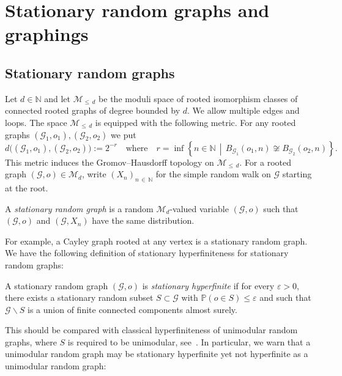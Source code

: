 \documentclass[AHL,Unicode,longabstracts,published]{cedram}
\newcommand{\bbN}{\mathbb{N}}
\newcommand{\bbP}{\mathbb{P}}
\newcommand{\calM}{\mathcal{M}}
\newcommand{\calG}{\mathcal{G}}
\begin{document}
\section{Stationary random graphs and graphings}\label{sec:stationary}

\subsection{Stationary random graphs}\label{sec:SRG}

Let $d\in\bbN$ and let $\calM_{\leq\,d}$ be the moduli space of rooted isomorphism classes of connected rooted graphs of degree bounded by $d$. We allow multiple edges and loops. The space $\calM_{\leq\,d}$ is equipped with the following metric. For any rooted graphs $(\calG_1,o_1),(\calG_2,o_2)$ we put
\[
d\big((\calG_1,o_1),(\calG_2,o_2)\big):=2^{-r} \quad\text{where}\quad r=\inf\left\{n\in\bbN \,\middle|\, B_{\calG_1}(o_1,n)\not\cong B_{\calG_2}(o_2,n)\right\}.
\]
This metric induces the Gromov--Hausdorff topology on $\calM_{\leq \,d}$. For a rooted graph $(\calG,o)\in \calM_d$, write $(X_n)_{n\,\in\,\bbN}$ for the simple random walk on $\calG$ starting at the root.

\begin{defi}
A \emph{stationary random graph} is a random $\calM_d$-valued variable $(\calG,o)$ such that $(\calG,o)$ and $(\calG,X_n)$ have the same distribution.
\end{defi}


For example, a Cayley graph rooted at any vertex is a stationary random graph. We have the following definition of stationary hyperfiniteness for stationary random graphs:

\begin{defi}
A stationary random graph $(\calG, o)$ is \emph{stationary hyperfinite} if for every $\varepsilon>0$, there exists a stationary random subset $S\subset \calG$ with $\bbP(o\in S)\leq \varepsilon$ and such that $\calG\backslash S$ is a union of finite connected components almost surely.
\end{defi}

This should be compared with classical hyperfiniteness of unimodular random graphs, where $S$ is required to be unimodular, see~\cite{Schramm2011}. In particular, we warn that a unimodular random graph may be stationary hyperfinite yet not hyperfinite as a unimodular random graph:
\end{document}
